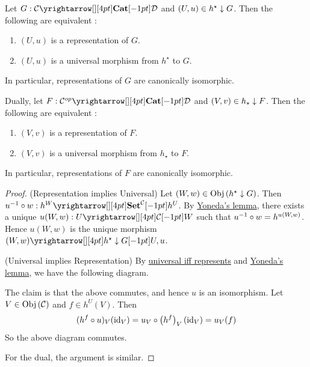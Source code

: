 \begin{prop}
  \hypertarget{canonical_rep}{}
  
  Let $G : \map{\CC}{\DD}{\CAT}{}$ and $(U,u) \in h^\star\downarrow G$.
  Then the following are equivalent : 
  \begin{enumerate}
    \item $(U,u)$ is a representation of $G$.
    \item $(U,u)$ is a universal morphism from $h^\star$ to $G$.
  \end{enumerate}
  In particular, 
  representations of $G$ are canonically isomorphic. 

  Dually, let $F : \map{\CC\op}{\DD}{\CAT}{}$ and $(V,v) \in h_\star\downarrow F$.
  Then the following are equivalent : 
  \begin{enumerate}
    \item $(V,v)$ is a representation of $F$.
    \item $(V,v)$ is a universal morphism from $h_\star$ to $F$.
  \end{enumerate}
  In particular, 
  representations of $F$ are canonically isomorphic. 
\end{prop}
\begin{proof}
  (Representation implies Universal)
  Let $(W,w) \in \mathrm{Obj}\left(h^\star\downarrow G\right)$.
  Then $u\inv \circ w : \map{h^W}{h^U}{\SET^\CC}{}$.
  By \hyperlink{yoneda}{Yoneda's lemma},
  there exists a unique $u(W,w) : \map{U}{W}{\CC}{}$ such that 
  $u^{-1} \circ w = h^{u(W,w)}$.
  Hence $u(W,w)$ is the unique morphism 
  $\map{(W,w)}{U,u}{h^\star\darrow G}{}$.

  (Universal implies Representation)
  By \hyperlink{uni_iff_rep}{universal iff represents}
  and \hyperlink{yoneda}{Yoneda's lemma},
  we have the following diagram. 
  \begin{figure}[H]
    \centering
  \end{figure}
  The claim is that the above commutes, and hence $u$ is an isomorphism.
  Let $V \in \mathrm{Obj}\left(\mathcal{C}\right)$ and $f \in h^U(V)$.
  Then \begin{align*}
    (h^f \circ u)_V(\mathrm{id}_{V})
    = u_V \circ \left(h^f\right)_V \left(\mathrm{id}_{V}\right)
    = u_V (f)
  \end{align*}
  So the above diagram commutes. 

  For the dual, the argument is similar. 
\end{proof}